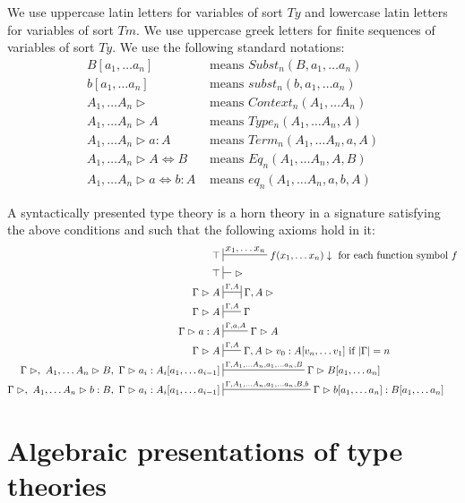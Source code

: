 \documentclass{amsart}
\theoremstyle{definition}
\theoremstyle{remark}
\newcommand{\deq}{\Leftrightarrow}
\newcommand{\ttvdash}{\vartriangleright}
\numberwithin{figure}{section}
\begin{document}
We use uppercase latin letters for variables of sort $Ty$ and lowercase latin letters for variables of sort $Tm$.
We use uppercase greek letters for finite sequences of variables of sort $Ty$.
We use the following standard notations:
\begin{align*}
B[a_1, \ldots a_n] & \text{ means } Subst_n(B, a_1, \ldots a_n) \\
b[a_1, \ldots a_n] & \text{ means } subst_n(b, a_1, \ldots a_n) \\
A_1, \ldots A_n \ttvdash & \text{ means } Context_n(A_1, \ldots A_n) \\
A_1, \ldots A_n \ttvdash A & \text{ means } Type_n(A_1, \ldots A_n, A) \\
A_1, \ldots A_n \ttvdash a : A & \text{ means } Term_n(A_1, \ldots A_n, a, A) \\
A_1, \ldots A_n \ttvdash A \deq B & \text{ means } Eq_n(A_1, \ldots A_n, A, B) \\
A_1, \ldots A_n \ttvdash a \deq b : A & \text{ means } eq_n(A_1, \ldots A_n, a, b, A)
\end{align*}

A syntactically presented type theory is a horn theory in a signature satisfying the above conditions and such that the following axioms hold in it:
\begin{align*}
\top & \sststile[d]{}{x_1, \ldots x_n} f(x_1, \ldots x_n) \downarrow \text{ for each function symbol $f$} \\
\top & \sststile[d]{}{} \ \ttvdash \\
\Gamma \ttvdash A & \ssststile{}{\Gamma, A} \Gamma, A \ttvdash \\
\Gamma \ttvdash A & \sststile{}{\Gamma, A} \Gamma \\
\Gamma \ttvdash a : A & \sststile{}{\Gamma, a, A} \Gamma \ttvdash A \\
\Gamma \ttvdash A & \sststile{}{\Gamma, A} \Gamma, A \ttvdash v_0 : A[v_n, \ldots v_1] \text{ if } |\Gamma| = n \\
\Gamma \ttvdash,\ A_1, \ldots A_n \ttvdash B,\ \Gamma \ttvdash a_i : A_i[a_1, \ldots a_{i-1}] & \sststile{}{\Gamma, A_1, \ldots A_n, a_1, \ldots a_n, B} \Gamma \ttvdash B[a_1, \ldots a_n] \\
\Gamma \ttvdash,\ A_1, \ldots A_n \ttvdash b : B,\ \Gamma \ttvdash a_i : A_i[a_1, \ldots a_{i-1}] & \sststile{}{\Gamma, A_1, \ldots A_n, a_1, \ldots a_n, B, b} \Gamma \ttvdash b[a_1, \ldots a_n] : B[a_1, \ldots a_n]
\end{align*}

\section{Algebraic presentations of type theories}
\end{document}
